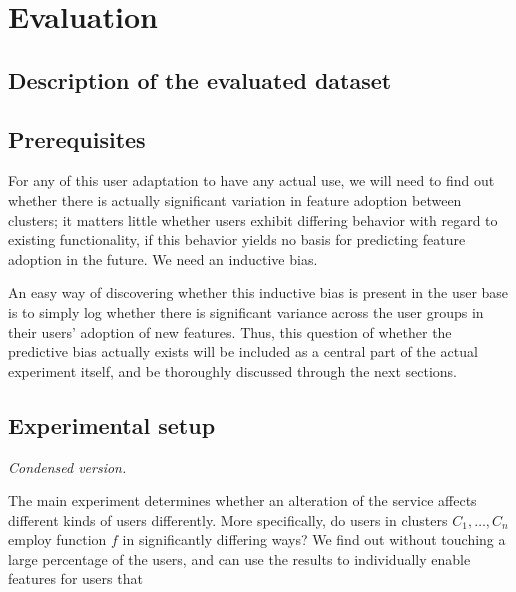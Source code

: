 \chapter{Evaluation}

\label{Chapter4}


\section{Description of the evaluated dataset} %
\label{eval:sec:description_of_the_evaluated_dataset}


\section{Prerequisites} %
\label{eval:sec:prerequisites}

For any of this user adaptation to have any actual use, we will need to find out whether there is actually significant variation in feature adoption between clusters; it matters little whether users exhibit differing behavior with regard to existing functionality, if this behavior yields no basis for predicting feature adoption in the future. We need an inductive bias.

An easy way of discovering whether this inductive bias is present in the user base is to simply log whether there is significant variance across the user groups in their users' adoption of new features. Thus, this question of whether the predictive bias actually exists will be included as a central part of the actual experiment itself, and be thoroughly discussed through the next sections.


\section{Experimental setup} %
\label{eval:sec:experimental_setup}

\emph{Condensed version.}

The main experiment determines whether an alteration of the service affects different kinds of users differently.
More specifically, do users in clusters $C_1, \ldots, C_n$ employ function $f$ in significantly differing ways? We find out without touching a large percentage of the users, and can use the results to individually enable features for users that

